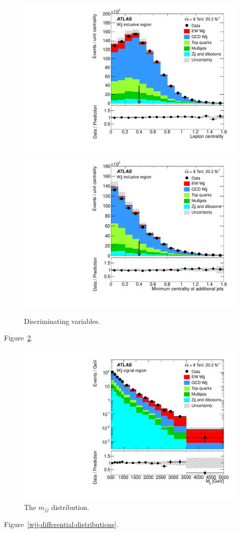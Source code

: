 \documentclass{PoS}
\begin{document}
\begin{figure}
\includegraphics[width=.49\textwidth]{STDM-2014-11/fig_05b.pdf}
\includegraphics[width=.49\textwidth]{STDM-2014-11/fig_05d.pdf}
  \caption{Discriminating variables.}
  \label{wjj-discriminating-variables}
\end{figure}

Figure~\ref{wjj-mjj-distribution}.

\begin{figure}
  \includegraphics[width=.49\textwidth]{STDM-2014-11/fig_09b.pdf}
  \caption{The $m_{jj}$ distribution.}
  \label{wjj-mjj-distribution}
\end{figure}

Figure~\ref{wjj-differential-distributions}.
\end{document}

